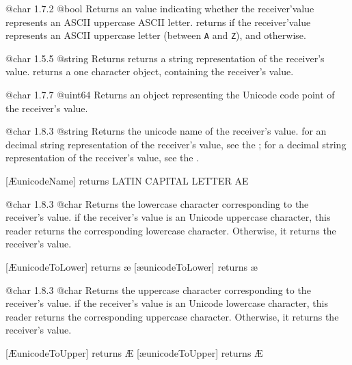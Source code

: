 {@char}
{1.7.2}
{@bool}
{Returns an  value indicating whether the receiver'value represents an ASCII uppercase ASCII letter.}
{returns  if the receiver'value represents an ASCII uppercase letter (between \texttt{\textquotesingle A\textquotesingle} and \texttt{\textquotesingle Z\textquotesingle}), and  otherwise.}





{@char}
{1.5.5}
{@string}
{Returns returns a string representation of the receiver's value.}
{returns a one character  object, containing the receiver's value.}




{@char}
{1.7.7}
{@uint64}
{Returns an  object representing the Unicode code point of the receiver's value.}
{}




{@char}
{1.8.3}
{@string}
{Returns the unicode name of the receiver's value.}
{for an decimal string representation of the receiver's value, see the ; for a decimal string representation of the receiver's value, see the .}

\exempleUneLigne
{}
{[\textquotesingle \AE \textquotesingle unicodeName] returns \textquotedbl LATIN CAPITAL LETTER AE \textquotedbl}




{@char}
{1.8.3}
{@char}
{Returns the lowercase character corresponding to the receiver's value.}
{if the receiver's value is an Unicode uppercase character, this reader returns the corresponding lowercase character. Otherwise, it returns the receiver's value.}

\exempleDeuxLignes
{}
{[\textquotesingle\AE\textquotesingle unicodeToLower] returns \textquotesingle\ae \textquotesingle}
{[\textquotesingle\ae\textquotesingle unicodeToLower] returns \textquotesingle\ae \textquotesingle}




{@char}
{1.8.3}
{@char}
{Returns the uppercase character corresponding to the receiver's value.}
{if the receiver's value is an Unicode lowercase character, this reader returns the corresponding uppercase character. Otherwise, it returns the receiver's value.}

\exempleDeuxLignes
{}
{[\textquotesingle\AE\textquotesingle unicodeToUpper] returns \textquotesingle\AE\textquotesingle}
{[\textquotesingle\ae\textquotesingle unicodeToUpper] returns \textquotesingle\AE\textquotesingle}





